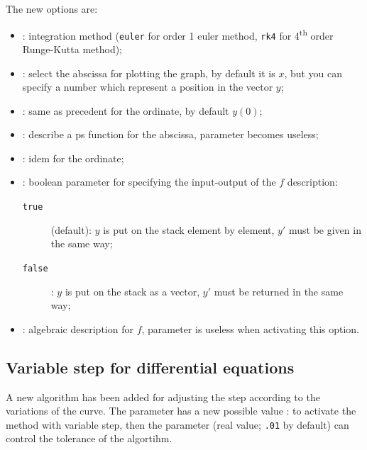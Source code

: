 \documentclass[11pt,english,BCOR=10mm,DIV=12,bibliography=totoc,parskip=false,headings=small,
    headinclude=false,footinclude=false,oneside]{pst-doc}
\begin{document}
The new options are:


\begin{itemize}\setlength\itemsep{0pt}\setlength\parsep{0pt}\setlength\parskip{0pt}
\item {}: integration method (\verb+euler+ for order 1 euler method, \verb+rk4+ for
  4\textsuperscript{th} order Runge-Kutta method);
\item {}: select the abscissa for plotting the graph, by default it is
  $x$, but you can specify a number which represent a position in the vector $y$;
\item {}: same as precedent for the ordinate, by default $y(0)$;
\item {}: describe a ps function for the abscissa, parameter
   becomes useless;
\item {}: idem for the ordinate;
\item {}: boolean parameter for specifying the input-output of the
  $f$ description:
  \begin{description}
  \item[\texttt{true}] (default): $y$ is put on the stack element by element, $y'$
    must be given in the same way;
  \item[\texttt{false}]: $y$ is put on the stack as a vector, $y'$ must be returned
  in the same way;
  \end{description}

\item {}: algebraic description for $f$, 
  parameter is useless when activating this option.
\end{itemize}



\clearpage
\subsection{Variable step for differential equations}

A new algorithm has been added for adjusting the step according to the variations of
the curve. The parameter  has a new possible value :  to
activate the  method with variable step, then the parameter
 (real value; \verb+.01+ by default) can control the tolerance of
the algortihm.
\end{document}
